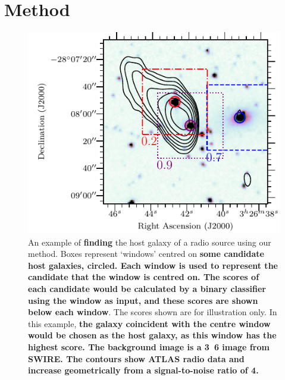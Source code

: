 \documentclass[fleqn,usenatbib,usedcolumn]{mnras}
\newcommand{\edited}[1]{{\bf {#1}}}
\begin{document}
  \section{Method}\label{sec:method}
    \begin{figure}
      \centering
      \includegraphics[width=\columnwidth]{images/figure_example_of_method.pdf}
      \caption{An example of \edited{finding} the host galaxy of a radio source using
        our method. Boxes represent `windows'
        centred on \edited{some candidate host galaxies, circled. Each window is used to represent the candidate that the window is centred
        on. The scores of each candidate would be calculated by a binary classifier using the window as input,
        and these scores are shown below each window}. The scores
        shown are for illustration only. In this example,
        \edited{the galaxy coincident with the centre window would be chosen as the host galaxy, as this
        window has the highest score. The background image is a \unit{3.6}{\micro\meter} image from SWIRE.
        The contours show ATLAS radio data and increase geometrically from a signal-to-noise ratio of 4.}}
      \label{fig:windows}
    \end{figure}
\end{document}
